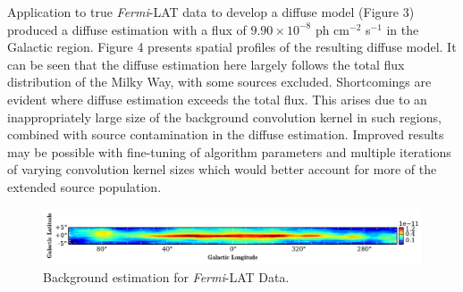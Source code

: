 \documentclass{PoS}
\begin{document}
Application to true \textit{Fermi}-LAT data to develop a diffuse model (Figure 3) produced a diffuse estimation with a flux of $9.90 \times 10^{-8}$ ph cm$^{-2}$ s$^{-1}$ in the Galactic region. Figure 4 presents spatial profiles of the resulting diffuse model. It can be seen that the diffuse estimation here largely follows the total flux distribution of the Milky Way, with some sources excluded. Shortcomings are evident where diffuse estimation exceeds the total flux. This arises due to an inappropriately large size of the background convolution kernel in such regions, combined with source contamination in the diffuse estimation. Improved results may be possible with fine-tuning of algorithm parameters and multiple iterations of varying convolution kernel sizes which would better account for more of the extended source population.

\begin{figure}
  \begin{center}
      \includegraphics[width=\textwidth]{figures/BG_DATA.pdf}
  \caption{Background estimation for \textit{Fermi}-LAT Data.}
  \end{center}
\end{figure}
\end{document}

